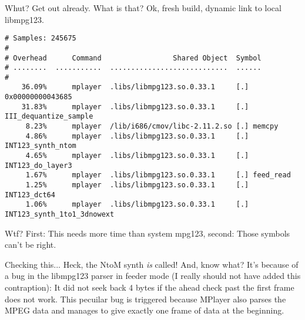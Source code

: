 \documentclass[a4paper,12pt]{scrartcl}
\begin{document}
Whut? Get out already. What is that?
Ok, fresh build, dynamic link to local libmpg123.
\begin{verbatim}
# Samples: 245675
#
# Overhead      Command                 Shared Object  Symbol
# ........  ...........  ............................  ......
#
    36.09%      mplayer  .libs/libmpg123.so.0.33.1     [.] 0x00000000043685
    31.83%      mplayer  .libs/libmpg123.so.0.33.1     [.] III_dequantize_sample
     8.23%      mplayer  /lib/i686/cmov/libc-2.11.2.so [.] memcpy
     4.86%      mplayer  .libs/libmpg123.so.0.33.1     [.] INT123_synth_ntom
     4.65%      mplayer  .libs/libmpg123.so.0.33.1     [.] INT123_do_layer3
     1.67%      mplayer  .libs/libmpg123.so.0.33.1     [.] feed_read
     1.25%      mplayer  .libs/libmpg123.so.0.33.1     [.] INT123_dct64
     1.06%      mplayer  .libs/libmpg123.so.0.33.1     [.] INT123_synth_1to1_3dnowext
\end{verbatim}
Wtf? First: This needs more time than system mpg123, second: Those symbols can't be right.

Checking this... Heck, the NtoM synth {\em is} called! And, know what? It's because of a bug in the libmpg123 parser in feeder mode (I really should not have added this contraption):
It did not seek back 4 bytes if the ahead check past the first frame does not work.
This pecuilar bug is triggered because MPlayer also parses the MPEG data and manages to give exactly one frame of data at the beginning.
\end{document}
